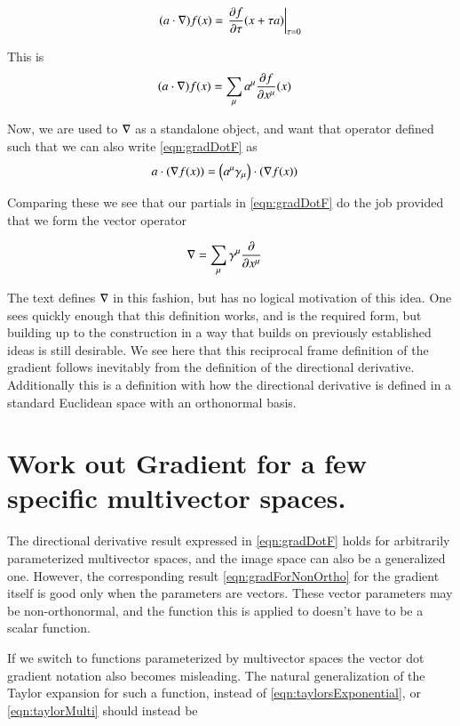 \documentclass{article}
\begin{document}
\begin{align*}
(a \cdot \grad) f(x) 
&=
\left. \PD{\tau}{f}(x + \tau a) \right\vert_{\tau=0} \\
\end{align*}

This is
\begin{align}\label{eqn:gradDotF}
(a \cdot \grad) f(x) &= \sum_\mu a^\mu \PD{x^\mu}{f}(x) 
\end{align}

Now, we are used to $\grad$ as a standalone object, and want that operator defined such that we can also write \ref{eqn:gradDotF}
as
\begin{align*}
a \cdot (\grad f(x))
&=
\left(a^\mu \gamma_\mu \right) \cdot (\grad f(x))
\end{align*}

Comparing these we see that our partials in \ref{eqn:gradDotF} do the job provided that we form the vector operator

\begin{align}\label{eqn:gradForNonOrtho}
\grad &= \sum_\mu \gamma^\mu \PD{x^\mu}{}
\end{align}

The text \cite{doran2003gap} defines $\grad$ in this fashion, but has no logical motivation of this idea.  One sees
quickly enough that this definition works, and is the required form, but building up to the construction
in a way that builds on previously established ideas is still desirable.
We see here that this reciprocal frame definition of the gradient follows inevitably from the definition
of the directional derivative.  Additionally this is a definition with how 
the directional derivative is defined in a standard Euclidean space with an orthonormal basis.

\section{ Work out Gradient for a few specific multivector spaces. }

The directional derivative result expressed in \ref{eqn:gradDotF} holds
for arbitrarily parameterized multivector spaces, and the image space
can also be a generalized one.  However, the corresponding result
\ref{eqn:gradForNonOrtho} for the gradient itself is good only when the
parameters are vectors.  These vector parameters may be non-orthonormal,
and the function
this is applied to doesn't have to be a scalar function.

If we switch to functions parameterized by multivector spaces the vector dot
gradient notation also becomes misleading.  The natural generalization
of the Taylor expansion for such a function, instead
of \ref{eqn:taylorsExponential}, or \ref{eqn:taylorMulti} should instead
be
\end{document}
